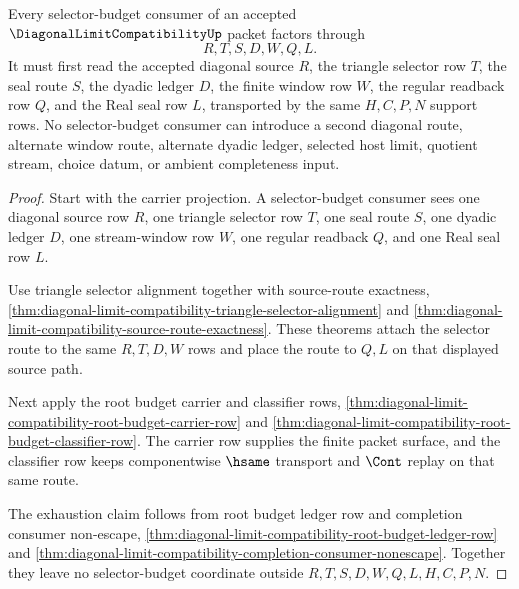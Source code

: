 \begin{theorem}
\label{thm:diagonal-limit-compatibility-root-selector-budget-exhaustion}
Every selector-budget consumer of an accepted $\DiagonalLimitCompatibilityUp$
packet factors through
$$
R,T,S,D,W,Q,L.
$$
It must first read the accepted diagonal source $R$, the triangle selector row
$T$, the seal route $S$, the dyadic ledger $D$, the finite window row $W$, the
regular readback row $Q$, and the Real seal row $L$, transported by the same
$H,C,P,N$ support rows. No selector-budget consumer can introduce a second
diagonal route, alternate window route, alternate dyadic ledger, selected
host limit, quotient stream, choice datum, or ambient completeness input.
\end{theorem}
\begin{proof}
Start with the carrier projection. A selector-budget consumer sees one
diagonal source row $R$, one triangle selector row $T$, one seal route $S$,
one dyadic ledger $D$, one stream-window row $W$, one regular readback $Q$,
and one Real seal row $L$.

Use triangle selector alignment together with source-route exactness,
\autoref{thm:diagonal-limit-compatibility-triangle-selector-alignment} and
\autoref{thm:diagonal-limit-compatibility-source-route-exactness}. These
theorems attach the selector route to the same $R,T,D,W$ rows and place the
route to $Q,L$ on that displayed source path.

Next apply the root budget carrier and classifier rows,
\autoref{thm:diagonal-limit-compatibility-root-budget-carrier-row} and
\autoref{thm:diagonal-limit-compatibility-root-budget-classifier-row}. The
carrier row supplies the finite packet surface, and the classifier row keeps
componentwise $\hsame$ transport and $\Cont$ replay on that same route.

The exhaustion claim follows from root budget ledger row and completion
consumer non-escape,
\autoref{thm:diagonal-limit-compatibility-root-budget-ledger-row} and
\autoref{thm:diagonal-limit-compatibility-completion-consumer-nonescape}.
Together they leave no selector-budget coordinate outside
$R,T,S,D,W,Q,L,H,C,P,N$.
\end{proof}

